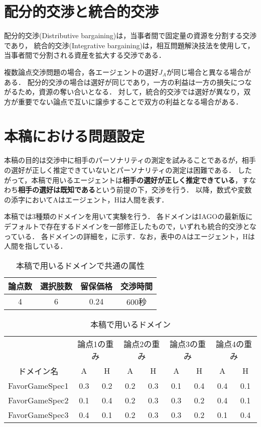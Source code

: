 \section{配分的交渉と統合的交渉}
配分的交渉(Distributive bargaining)は，当事者間で固定量の資源を分割する交渉であり，
統合的交渉(Integrative bargaining)は，相互問題解決技法を使用して，当事者間で分割される資産を拡大する交渉である．

複数論点交渉問題の場合，各エージェントの選好$J_A$が同じ場合と異なる場合がある．
配分的交渉の場合は選好が同じであり，一方の利益は一方の損失につながるため，資源の奪い合いとなる．
対して，統合的交渉では選好が異なり，双方が重要でない論点で互いに譲歩することで双方の利益となる場合がある．

\section{本稿における問題設定}
本稿の目的は交渉中に相手のパーソナリティの測定を試みることであるが，相手の選好が正しく推定できていないとパーソナリティの測定は困難である．
したがって，本稿で用いるエージェントは{\bf 相手の選好が正しく推定できている}，すなわち{\bf 相手の選好は既知である}という前提の下，交渉を行う．
以降，数式や変数の添字においてAはエージェント，Hは人間を表す．

本稿では3種類のドメインを用いて実験を行う．
各ドメインはIAGOの最新版にデフォルトで存在するドメインを一部修正したもので，いずれも統合的交渉となっている．
各ドメインの詳細を，に示す．なお，表中のAはエージェント，Hは人間を指している．

\begin{table}[!tb]
  \centering
  \caption{本稿で用いるドメインで共通の属性}
  \begin{tabular}{cccc} \toprule
      論点数 & 選択肢数 & 留保価格 & 交渉時間 \\ \midrule
      4 & 6 & 0.24 & 600秒\\ \bottomrule
  \end{tabular}
  \label{tab:common-domain}
\end{table}

\begin{table}[!tb]
  \centering
  \caption{本稿で用いるドメイン}
  \begin{tabular}{ccccccccc} \toprule
      & \multicolumn{2}{c}{論点1の重み} & \multicolumn{2}{c}{論点2の重み} & \multicolumn{2}{c}{論点3の重み} & \multicolumn{2}{c}{論点4の重み} \\
      ドメイン名  & A & H & A & H & A & H & A & H \\ \midrule
      FavorGameSpec1 & 0.3 & 0.2 & 0.2 & 0.3 & 0.1 & 0.4 & 0.4 & 0.1 \\
      FavorGameSpec2 & 0.1 & 0.4 & 0.2 & 0.3 & 0.3 & 0.2 & 0.4 & 0.1 \\
      FavorGameSpec3 & 0.4 & 0.1 & 0.2 & 0.3 & 0.3 & 0.2 & 0.1 & 0.4 \\ \bottomrule
  \end{tabular}
  \label{tab:domain}
\end{table}

